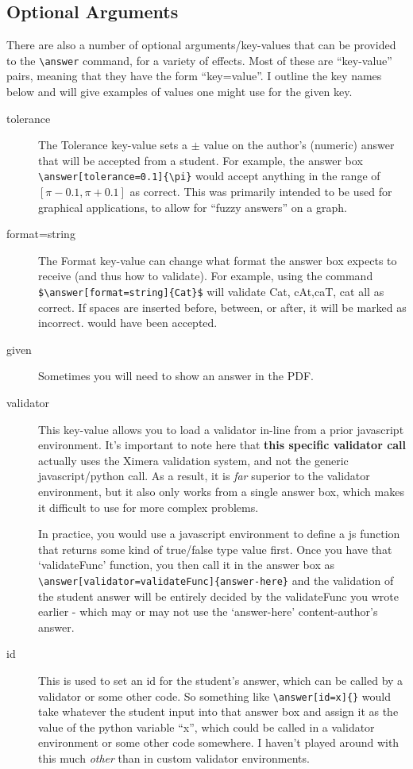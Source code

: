 \documentclass{ximera}
\begin{document}
\subsection{Optional Arguments}

There are also a number of optional arguments/key-values that can be provided
to the \verb|\answer| command, for a variety of effects. Most of these are
``key-value'' pairs, meaning that they have the form ``key=value''. I outline
the key names below and will give examples of values one might use for the
given key.

\begin{description}
  \item[tolerance] The Tolerance key-value sets a $\pm$ value on the
    author's (numeric) answer that will be accepted from a student. For
    example,
    the answer box \verb|\answer[tolerance=0.1]{\pi}| would accept anything in
    the
    range of $[\pi-0.1,\pi+0.1]$ as correct. This was primarily intended to be
    used
    for graphical applications, to allow for ``fuzzy answers'' on a graph.
  \item[format=string] The Format key-value can change what format the answer
    box
    expects to receive (and thus how to validate). For example, using the
    command
    \verb|$\answer[format=string]{Cat}$| will validate Cat, cAt,caT, cat all as
    correct. If spaces are inserted before, between, or after, it will be marked as
    incorrect.
    would have been accepted.

  \item[given] Sometimes you will need to show an answer in the PDF.
  \item[validator] This key-value allows you to load a validator in-line
  from a prior javascript environment. It's important to note here that
  \textbf{this specific validator call} actually uses the Ximera validation
  system, and not the generic javascript/python call. As a result, it is
  \textit{far} superior to the validator environment, but it also only works
  from
  a single answer box, which makes it difficult to use for more complex
  problems.

  In practice, you would use a javascript environment to define a js function
  that returns some kind of true/false type value first. Once you have that
  `validateFunc' function, you then call it in the answer box as
  \verb|\answer[validator=validateFunc]{answer-here}| and the validation of
  the
  student answer will be entirely decided by the validateFunc you wrote
  earlier -
  which may or may not use the `answer-here' content-author's answer.

\item[id] This is used to set an id for the student's answer, which can be
  called by a validator or some other code. So something like
  \verb|\answer[id=x]{}| would take whatever the student input into that
  answer
  box and assign it as the value of the python variable ``x'', which could be
  called in a validator environment or some other code somewhere. I haven't
  played around with this much \textit{other} than in custom validator
  environments.

\end{description}
\end{document}
